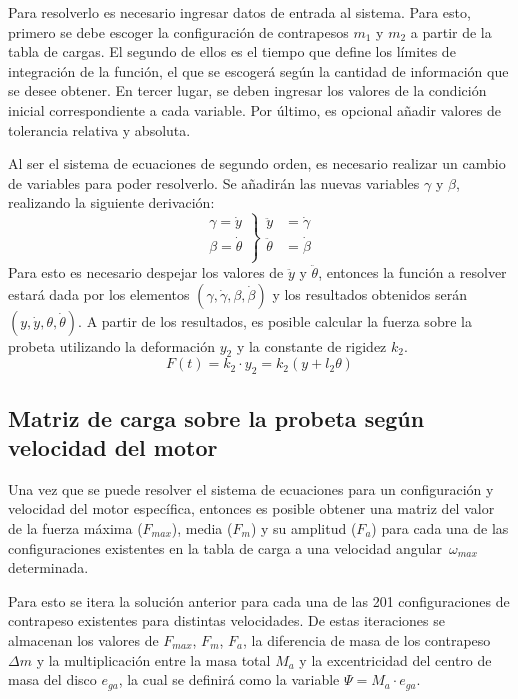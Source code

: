 Para resolverlo es necesario ingresar datos de entrada al sistema. Para esto, primero se debe escoger la configuración de contrapesos $m_1$ y $m_2$ a partir de la tabla de cargas. El segundo de ellos es el tiempo que define los límites de integración de la función, el que se escogerá según la cantidad de información que se desee obtener. En tercer lugar, se deben ingresar los valores de la condición inicial correspondiente a cada variable. Por último, es opcional añadir valores de tolerancia relativa y absoluta.

Al ser el sistema de ecuaciones de segundo orden, es necesario realizar un cambio de variables para poder resolverlo. Se añadirán las nuevas variables $\gamma$ y $\beta$, realizando la siguiente derivación:
\[ \left. 
\begin{array}{ll}
	\gamma = \dot{y}\\
	\beta = \dot{\theta}\\
\end{array}
\right\}
\begin{array}{ll}
	\ddot{y} &= \dot{\gamma}\\
	\ddot{\theta} &= \dot{\beta}\\
\end{array}\]
Para esto es necesario despejar los valores de $\ddot{y}$ y $\ddot{\theta}$, entonces la función a resolver estará dada por los elementos $(\gamma, \dot{\gamma}, \beta, \dot{\beta})$ y los resultados obtenidos serán $(y, \dot{y}, \theta, \dot{\theta})$. A partir de los resultados, es posible calcular la fuerza sobre la probeta utilizando la deformación $y_2$ y la constante de rigidez $k_2$.
\begin{equation}\label{eq:fuerza_probeta}
	F(t) = k_2 \cdot y_2 = k_2(y + l_2\theta)
\end{equation}

\subsection{Matriz de carga sobre la probeta según velocidad del motor}
Una vez que se puede resolver el sistema de ecuaciones para un configuración y velocidad del motor específica, entonces es posible obtener una matriz del valor de la fuerza máxima ($F_{max}$), media ($F_m$) y su amplitud ($F_a$) para cada una de las configuraciones existentes en la tabla de carga a una velocidad angular $\,\omega_{max}\,$ determinada.

Para esto se itera la solución anterior para cada una de las 201 configuraciones de contrapeso existentes para distintas velocidades. De estas iteraciones se almacenan los valores de $F_{max}$, $F_m$, $F_a$, la diferencia de masa de los contrapeso $\Delta m$ y la multiplicación entre la masa total $M_a$ y la excentricidad del centro de masa del disco $e_{ga}$, la cual se definirá como la variable $\Psi=M_a \cdot e_{ga}$.

